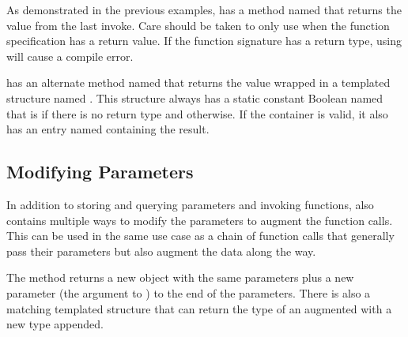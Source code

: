 

As demonstrated in the previous examples,
 has a method named
 that returns the value from the last invoke. Care
should be taken to only use  when the function
specification has a return value. If the function signature has a
 return type, using  will cause a
compile error.

 has an alternate method named
 that returns the value wrapped in a templated
structure named . This
structure always has a static constant Boolean named  that
is  if there is no return type and 
otherwise. If the container is valid, it also has an entry named
 containing the result.


\subsection{Modifying Parameters}

In addition to storing and querying parameters and invoking functions,
 also contains multiple ways to modify
the parameters to augment the function calls. This can be used in the same
use case as a chain of function calls that generally pass their parameters
but also augment the data along the way.


The  method returns a new
 object with the same parameters plus a
new parameter (the argument to ) to the end of the
parameters. There is also a matching  templated
structure that can return the type of an augmented
 with a new type appended.



